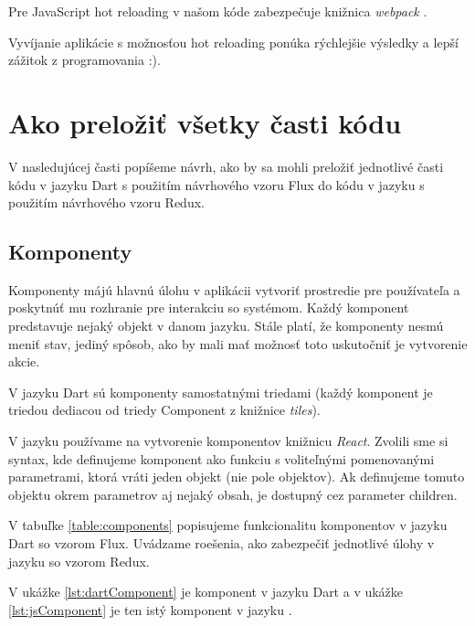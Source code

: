 Pre JavaScript hot reloading v našom kóde zabezpečuje knižnica \emph{webpack} \cite{webpack}.

Vyvíjanie aplikácie s možnosťou hot reloading ponúka rýchlejšie výsledky a lepší zážitok z programovania :).

\section{Ako preložiť všetky časti kódu}

V nasledujúcej časti popíšeme návrh, ako by sa mohli preložiť jednotlivé časti kódu v jazyku Dart s použitím návrhového vzoru Flux do kódu v jazyku \JS{} s použitím návrhového vzoru Redux.

\subsection{Komponenty}
Komponenty májú hlavnú úlohu v aplikácii vytvoriť prostredie pre používateľa a poskytnúť mu rozhranie pre interakciu so systémom. Každý komponent predstavuje nejaký objekt v danom jazyku. 
Stále platí, že komponenty nesmú meniť stav, jediný spôsob, ako by mali mať možnosť toto uskutočniť je vytvorenie akcie.

V jazyku Dart sú komponenty samostatnými triedami (každý komponent je triedou dediacou od triedy Component z knižnice \emph{tiles}).

V jazyku \JS{} používame na vytvorenie komponentov knižnicu \emph{React}. Zvolili sme si syntax, kde definujeme komponent ako funkciu s voliteľnými pomenovanými parametrami, ktorá vráti jeden objekt (nie pole objektov). 
Ak definujeme tomuto objektu okrem parametrov aj nejaký obsah, je dostupný cez parameter children.

V tabuľke \ref{table:components} popisujeme funkcionalitu komponentov v jazyku Dart so vzorom Flux. Uvádzame roešenia, ako zabezpečiť jednotlivé úlohy v jazyku \JS{} so vzorom Redux.

V ukážke \ref{lst:dartComponent} je komponent v jazyku Dart a v ukážke \ref{lst:jsComponent} je ten istý komponent v jazyku \JS{}.


